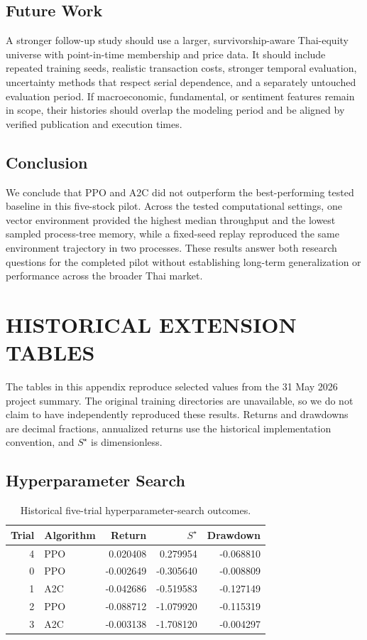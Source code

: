 \documentclass[12pt,a4paper,oneside]{book}
\theoremstyle{plain}
\numberwithin{equation}{chapter} \DeclareMathOperator{\Var}{Var}
\begin{document}
\section{Future Work}
A stronger follow-up study should use a larger, survivorship-aware Thai-equity universe with point-in-time membership and price data. It should include repeated training seeds, realistic transaction costs, stronger temporal evaluation, uncertainty methods that respect serial dependence, and a separately untouched evaluation period. If macroeconomic, fundamental, or sentiment features remain in scope, their histories should overlap the modeling period and be aligned by verified publication and execution times.

\section{Conclusion}
We conclude that PPO and A2C did not outperform the best-performing tested baseline in this five-stock pilot. Across the tested computational settings, one vector environment provided the highest median throughput and the lowest sampled process-tree memory, while a fixed-seed replay reproduced the same environment trajectory in two processes. These results answer both research questions for the completed pilot without establishing long-term generalization or performance across the broader Thai market.
\FloatBarrier

\appendix
{}
\chapter{HISTORICAL EXTENSION TABLES}
\label{app:history}
The tables in this appendix reproduce selected values from the 31 May 2026 project summary. The original training directories are unavailable, so we do not claim to have independently reproduced these results. Returns and drawdowns are decimal fractions, annualized returns use the historical implementation convention, and $S^\star$ is dimensionless.
\section{Hyperparameter Search}

\begin{table}[H]
\centering\small
\caption{Historical five-trial hyperparameter-search outcomes.}
\label{tab:search}
\begin{tabular}{@{}rlrrr@{}}
\toprule
Trial & Algorithm & Return & $S^\star$ & Drawdown \\
\midrule
4 & PPO & 0.020408 & 0.279954 & -0.068810 \\
0 & PPO & -0.002649 & -0.305640 & -0.008809 \\
1 & A2C & -0.042686 & -0.519583 & -0.127149 \\
2 & PPO & -0.088712 & -1.079920 & -0.115319 \\
3 & A2C & -0.003138 & -1.708120 & -0.004297 \\
\bottomrule
\end{tabular}
\end{table}
\end{document}

